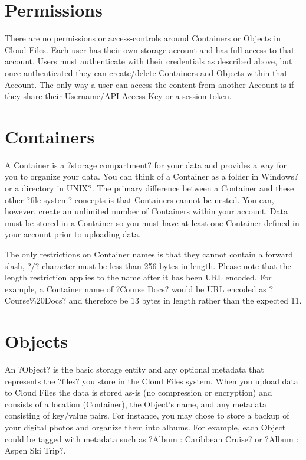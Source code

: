 \documentclass[letterpaper,10pt,english]{manual}
\begin{document}
\section{Permissions}

There are no permissions or access-controls around Containers or Objects
in Cloud Files.  Each user has their own storage account and has full
access to that account. Users must authenticate with their credentials as
described above, but once authenticated they can create/delete Containers
and Objects within that Account.  The only way a user can access the
content from another Account is if they share their Username/API Access
Key or a session token.


\section{Containers}

A Container is a ?storage compartment? for your data and provides a way
for you to organize your data. You can think of a Container as a folder
in Windows? or a directory in UNIX?. The primary difference between a
Container and these other ?file system? concepts is that Containers cannot
be nested. You can, however, create an unlimited number of Containers
within your account.  Data must be stored in a Container so you must have
at least one Container defined in your account prior to uploading data.

The only restrictions on Container names is that they cannot contain a
forward slash, ?/? character must be less than 256 bytes in length.
Please note that the length restriction applies to the name after it has
been URL encoded.  For example, a Container name of ?Course Docs? would be
URL encoded as ?Course\%20Docs? and therefore be 13 bytes in length rather
than the expected 11.


\section{Objects}

An ?Object? is the basic storage entity and any optional metadata that
represents the ?files? you store in the Cloud Files system. When you
upload data to Cloud Files the data is stored as-is (no compression or
encryption) and consists of a location (Container), the Object's name,
and any metadata consisting of key/value pairs. For instance, you may
chose to store a backup of your digital photos and organize them into
albums.  For example, each Object could be tagged with metadata such as
?Album : Caribbean Cruise? or ?Album : Aspen Ski Trip?.
\end{document}
